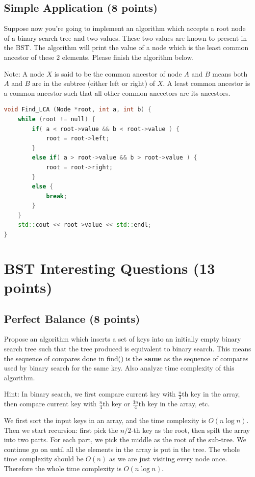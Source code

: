 \documentclass[11pt]{exam}
\begin{document}
\subsection{Simple Application (8 points)}
Suppose now you're going to implement an algorithm which accepts a root node of a binary search tree and two values. These two values are known to present in the BST. The algorithm will print the value of a node which is the least common ancestor of these 2 elements. Please finish the algorithm below.

Note: A node $X$ is said to be the common ancestor of node $A$ and $B$ means both $A$ and $B$ are in the subtree (either left or right) of $X$. A least common ancestor is a common ancestor such that all other common ancectors are its ancestors.
\begin{lstlisting}[language=c++]
void Find_LCA (Node *root, int a, int b) {
    while (root != null) {
        if( a < root->value && b < root->value ) {
            root = root->left;
        }
        else if( a > root->value && b > root->value ) {
            root = root->right;
        }
        else {
            break;
        }
    }
    std::cout << root->value << std::endl; 
}
\end{lstlisting}
\newpage
\section{BST Interesting Questions (13 points)}
\subsection{Perfect Balance (8 points)}
Propose an algorithm which inserts a set of keys into an initially empty binary search tree such that the tree produced is equivalent to binary search. This means the sequence of compares done in find() is the \textbf{same} as the sequence of compares used by binary search for the same key. Also analyze time complexity of this algorithm.

Hint: In binary search, we first compare current key with $\frac{n}{2}$th key in the array, then compare current key with $\frac{n}{4}$th key or $\frac{3n}{4}$th key in the array, etc.

\begin{solution}
We first sort the input keys in an array, and the time complexity is $O(n \log n)$.
Then we start recursion: first pick the $n/2$-th key as the root, then spilt the 
array into two parts. For each part, we pick the middle as the root of the sub-tree.
We continue go on until all the elements in the array is put in the tree. The whole time complexity should 
be $O(n)$ as we are just visiting every node once.
Therefore the whole time complexity is $O(n \log n)$.
\end{solution}
\end{document}
